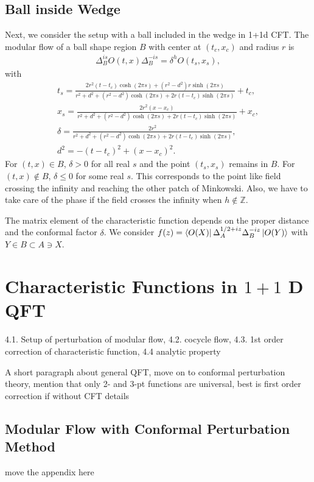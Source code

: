 \documentclass[a4paper,11pt]{article}
\theoremstyle{definition}
\begin{document}
\subsection{Ball inside Wedge}
Next, we consider the setup with a ball included in the wedge in 1+1d CFT. The modular flow of a ball shape region $B$ with center at $(t_c,x_c)$ and radius $r$ is
\begin{align}
    \Delta_B^{is} O(t,x) \Delta_B^{-is} = \delta^h O(t_s,x_s),
\end{align}
with
\begin{gather}
    t_s = \frac{2r^2(t-t_c) \cosh(2\pi s) + (r^2-d^2)r \sinh(2\pi s)}{r^2+d^2 + (r^2-d^2)\cosh(2\pi s) +2r(t-t_c)\sinh(2\pi s)} + t_c,\\
    x_s = \frac{2r^2(x-x_c)}{r^2+d^2 + (r^2-d^2)\cosh(2\pi s) +2r(t-t_c)\sinh(2\pi s)} + x_c,\\
    \delta = \frac{2r^2}{r^2+d^2 + (r^2-d^2)\cosh(2\pi s) +2r(t-t_c)\sinh(2\pi s)}, \\
    d^2 = -(t-t_c)^2 + (x-x_c)^2.
\end{gather}
For $(t,x) \in B$, $\delta>0$ for all real $s$ and the point $(t_s,x_s)$ remains in $B$. For $(t,x) \notin B$, $\delta\leq 0$ for some real $s$. This corresponds to the point like field crossing the infinity and reaching the other patch of Minkowski. Also, we have to take care of the phase if the field crosses the infinity when $h\notin\mathbb{Z}$.

The matrix element of the characteristic function depends on the proper distance and the conformal factor $\delta$. We consider $f(z)=\bra{O(X)}\Delta_A^{1/2+iz}\Delta_B^{-iz}\ket{O(Y)}$ with $Y\in B \subset A\ni X$.

\section{Characteristic Functions in $1+1$ D QFT}\label{section:conformalperturbation}
4.1. Setup of perturbation of modular flow, 4.2. cocycle flow, 4.3. 1st order correction of characteristic function, 4.4 analytic property 

A short paragraph about general QFT, move on to conformal perturbation theory, mention that only 2- and 3-pt functions are universal, best is first order correction if without CFT details 
\subsection{Modular Flow with Conformal Perturbation Method}
move the appendix here
\end{document}
